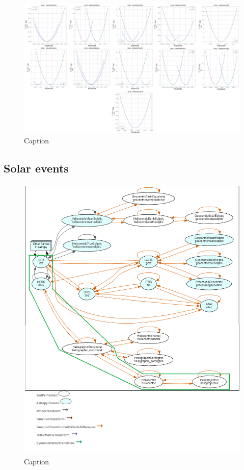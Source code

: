        \begin{figure}[H]
        \centering
        \includegraphics[width = \textwidth]{report/Figures/models/2204/threshold_determination_notconst.png}
        \caption{Caption}
        \label{threshold}
        \end{figure}

    
    
    \subsection{Solar events}
    
    \begin{figure}[H]
        \centering
        \includegraphics[width = 12cm]{report/Figures/methods/coordinates.png}
        \caption{Caption}
        \label{coordinates}
    \end{figure}

